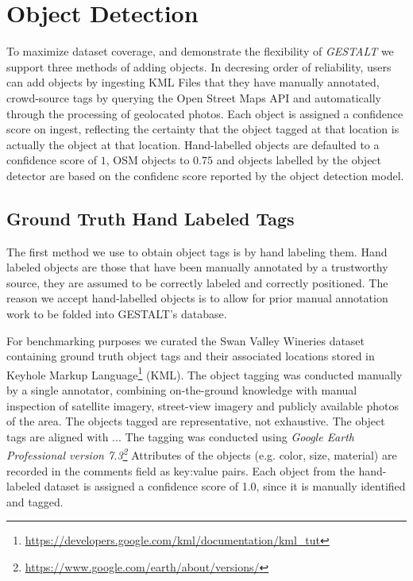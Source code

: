 \section{Object Detection}
\label{section:object}

To maximize dataset coverage, and demonstrate the flexibility of \emph{GESTALT} we support three methods of adding objects. 
In decresing order of reliability, users can add objects by ingesting KML Files that they have manually annotated, crowd-source tags by querying the Open Street Maps API and automatically through the processing of geolocated photos. 
Each object is assigned a confidence score on ingest, reflecting the certainty that the object tagged at that location is actually the object at that location. 
Hand-labelled objects are defaulted to a confidence score of $1$, OSM objects to $0.75$ and objects labelled by the object detector are based on the confidenc score reported by the object detection model. 

\subsection{Ground Truth Hand Labeled Tags}
The first method we use to obtain object tags is by hand labeling them. 
Hand labeled objects are those that have been manually annotated by a trustworthy source, they are assumed to be correctly labeled and correctly positioned. 
The reason we accept hand-labelled objects is to allow for prior manual annotation work to be folded into GESTALT's database. 

For benchmarking purposes we curated the Swan Valley Wineries dataset containing ground truth object tags and their associated locations stored in Keyhole Markup Language\footnote{\href{https://developers.google.com/kml/documentation/kml_tut}{https://developers.google.com/kml/documentation/kml_tut}} (KML).
The object tagging was conducted manually by a single annotator, combining on-the-ground knowledge with manual inspection of satellite imagery, street-view imagery and publicly available photos of the area. 
The objects tagged are representative, not exhaustive. 
The object tags are aligned with ... 
The tagging was conducted using \textit{Google Earth Professional version 7.3\footnote{\href{https://www.google.com/earth/about/versions/}{https://www.google.com/earth/about/versions/}}}
Attributes of the objects (e.g. color, size, material) are recorded in the comments field as key:value pairs.
Each object from the hand-labeled dataset is assigned a confidence score of 1.0, since it is manually identified and tagged.

